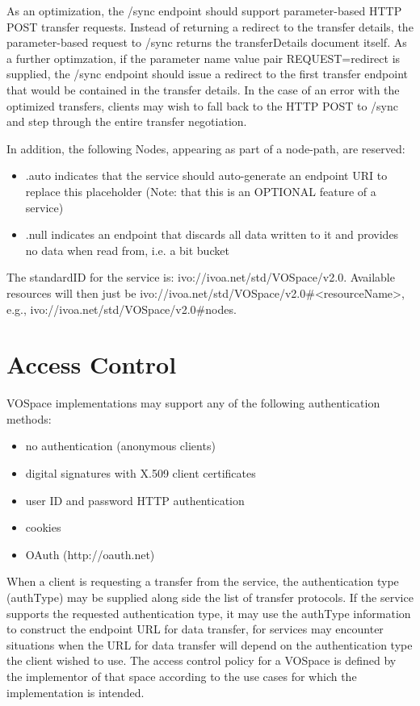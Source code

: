 \documentclass[11pt,a4paper]{ivoa}
\begin{document}
As an optimization, the /sync endpoint should support parameter-based HTTP POST transfer requests. Instead of returning a redirect to the transfer details, the parameter-based request to /sync returns the transferDetails document itself. As a further optimzation, if the parameter name value pair REQUEST=redirect is supplied, the /sync endpoint should issue a redirect to the first transfer endpoint that would be contained in the transfer details. In the case of an error with the optimized transfers, clients may wish to fall back to the HTTP POST to /sync and step through the entire transfer negotiation.

In addition, the following Nodes, appearing as part of a node-path, are reserved:

\begin{itemize}
    \item .auto indicates that the service should auto-generate an endpoint URI to replace this placeholder (Note: that this is an OPTIONAL feature of a service)
    \item .null indicates an endpoint that discards all data written to it and provides no data when read from, i.e. a bit bucket
\end{itemize}

The standardID for the service is: ivo://ivoa.net/std/VOSpace/v2.0. Available resources will then just be ivo://ivoa.net/std/VOSpace/v2.0\#<resourceName>, e.g., ivo://ivoa.net/std/VOSpace/v2.0\#nodes.

\section{Access Control}
VOSpace implementations may support any of the following authentication methods:

\begin{itemize}
    \item no authentication (anonymous clients)
    \item digital signatures with X.509 client certificates
    \item user ID and password HTTP authentication
    \item cookies
    \item OAuth (http://oauth.net)
\end{itemize}

When a client is requesting a transfer from the service, the authentication type (authType) may be supplied along side the list of transfer protocols. If the service supports the requested authentication type, it may use the authType information to construct the endpoint URL for data transfer, for services may encounter situations when the URL for data transfer will depend on the authentication type the client wished to use.
The access control policy for a VOSpace is defined by the implementor of that space according to the use cases for which the implementation is intended.
\end{document}
